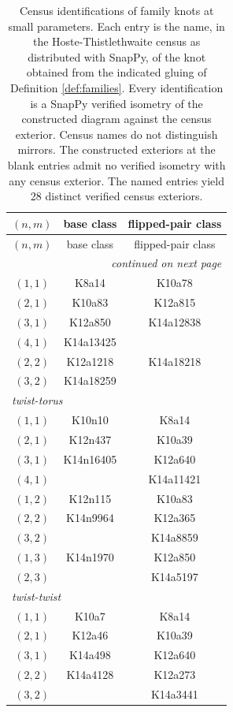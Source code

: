 \documentclass{article}
\theoremstyle{plain}
\theoremstyle{definition}
\theoremstyle{plain}
\theoremstyle{plain}
\theoremstyle{plain}
\theoremstyle{remark}
\theoremstyle{remark}
\theoremstyle{plain}
\theoremstyle{plain}
\theoremstyle{plain}
\theoremstyle{plain}
\begin{document}
\begin{longtable}{c|cc}
	\caption{Census identifications of family knots at small parameters. Each entry is the name, in the Hoste-Thistlethwaite census as distributed with SnapPy, of the knot obtained from the indicated gluing of Definition \ref{def:families}. Every identification is a SnapPy verified isometry of the constructed diagram against the census exterior. Census names do not distinguish mirrors. The constructed exteriors at the blank entries admit no verified isometry with any census exterior. The named entries yield 28 distinct verified census exteriors.}
	\label{tab:instances} \\
		\toprule
		$(n, m)$ & base class & flipped-pair class \\
		\midrule
		\endfirsthead
		\toprule
		$(n, m)$ & base class & flipped-pair class \\
		\midrule
		\endhead
		\midrule
		\multicolumn{3}{r}{\emph{continued on next page}}
		\endfoot
		\bottomrule
		\endlastfoot
		\multicolumn{3}{l}{\emph{torus-torus}} \\
		$(1,1)$ & K8a14 & K10a78 \\
		$(2,1)$ & K10a83 & K12a815 \\
		$(3,1)$ & K12a850 & K14a12838 \\
		$(4,1)$ & K14a13425 & \\
		$(2,2)$ & K12a1218 & K14a18218 \\
		$(3,2)$ & K14a18259 & \\
		\midrule
		\multicolumn{3}{l}{\emph{twist-torus}} \\
		$(1,1)$ & K10n10 & K8a14 \\
		$(2,1)$ & K12n437 & K10a39 \\
		$(3,1)$ & K14n16405 & K12a640 \\
		$(4,1)$ & & K14a11421 \\
		$(1,2)$ & K12n115 & K10a83 \\
		$(2,2)$ & K14n9964 & K12a365 \\
		$(3,2)$ & & K14a8859 \\
		$(1,3)$ & K14n1970 & K12a850 \\
		$(2,3)$ & & K14a5197 \\
		\midrule
		\multicolumn{3}{l}{\emph{twist-twist}} \\
		$(1,1)$ & K10a7 & K8a14 \\
		$(2,1)$ & K12a46 & K10a39 \\
		$(3,1)$ & K14a498 & K12a640 \\
		$(2,2)$ & K14a4128 & K12a273 \\
		$(3,2)$ & & K14a3441 \\
		\bottomrule
\end{longtable}
\end{document}
